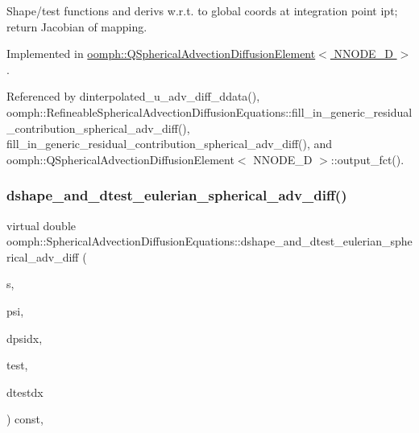 Shape/test functions and derivs w.\+r.\+t. to global coords at integration point ipt; return Jacobian of mapping. 



Implemented in \hyperlink{classoomph_1_1QSphericalAdvectionDiffusionElement_ac15987174b58e77489aa6e5f12b9db81}{oomph\+::\+Q\+Spherical\+Advection\+Diffusion\+Element$<$ N\+N\+O\+D\+E\+\_\+D $>$}.



Referenced by dinterpolated\+\_\+u\+\_\+adv\+\_\+diff\+\_\+ddata(), oomph\+::\+Refineable\+Spherical\+Advection\+Diffusion\+Equations\+::fill\+\_\+in\+\_\+generic\+\_\+residual\+\_\+contribution\+\_\+spherical\+\_\+adv\+\_\+diff(), fill\+\_\+in\+\_\+generic\+\_\+residual\+\_\+contribution\+\_\+spherical\+\_\+adv\+\_\+diff(), and oomph\+::\+Q\+Spherical\+Advection\+Diffusion\+Element$<$ N\+N\+O\+D\+E\+\_\+D $>$\+::output\+\_\+fct().

\mbox{\label{classoomph_1_1SphericalAdvectionDiffusionEquations_adad87bb3578d688543743e139aa1d84f}} 
\subsubsection{\texorpdfstring{dshape\+\_\+and\+\_\+dtest\+\_\+eulerian\+\_\+spherical\+\_\+adv\+\_\+diff()}{dshape\_and\_dtest\_eulerian\_spherical\_adv\_diff()}}
{\footnotesize\ttfamily virtual double oomph\+::\+Spherical\+Advection\+Diffusion\+Equations\+::dshape\+\_\+and\+\_\+dtest\+\_\+eulerian\+\_\+spherical\+\_\+adv\+\_\+diff (\begin{DoxyParamCaption}\item[{const \hyperlink{classoomph_1_1Vector}{Vector}$<$ double $>$ \&}]{s,  }\item[{\hyperlink{classoomph_1_1Shape}{Shape} \&}]{psi,  }\item[{\hyperlink{classoomph_1_1DShape}{D\+Shape} \&}]{dpsidx,  }\item[{\hyperlink{classoomph_1_1Shape}{Shape} \&}]{test,  }\item[{\hyperlink{classoomph_1_1DShape}{D\+Shape} \&}]{dtestdx }\end{DoxyParamCaption}) const\hspace{0.3cm}{\ttfamily [protected]}, {}}



